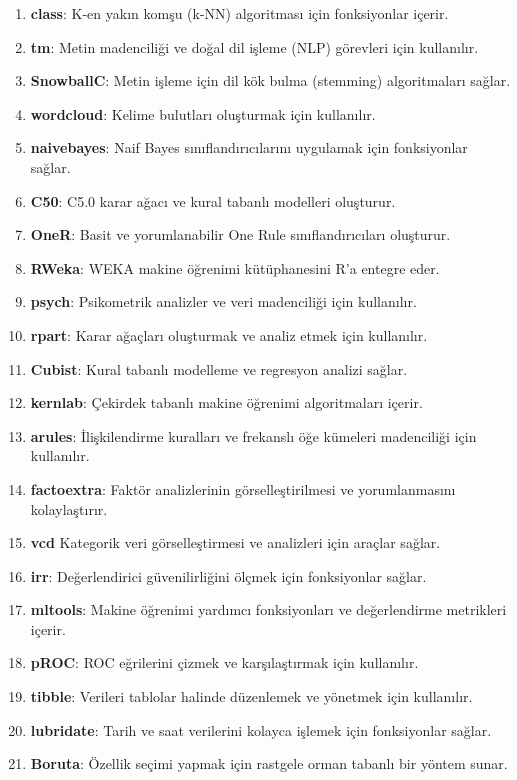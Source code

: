 \begin{enumerate}
    \item \textbf{class}: K-en yakın komşu (k-NN) algoritması için fonksiyonlar içerir.
    \item \textbf{tm}: Metin madenciliği ve doğal dil işleme (NLP) görevleri için kullanılır.
    \item \textbf{SnowballC}: Metin işleme için dil kök bulma (stemming) algoritmaları sağlar.
    \item \textbf{wordcloud}: Kelime bulutları oluşturmak için kullanılır.
    \item \textbf{naivebayes}: Naif Bayes sınıflandırıcılarını uygulamak için fonksiyonlar sağlar.
    \item \textbf{C50}: C5.0 karar ağacı ve kural tabanlı modelleri oluşturur.
    \item \textbf{OneR}: Basit ve yorumlanabilir One Rule sınıflandırıcıları oluşturur.
    \item \textbf{RWeka}: WEKA makine öğrenimi kütüphanesini R'a entegre eder.
    \item \textbf{psych}: Psikometrik analizler ve veri madenciliği için kullanılır.
    \item \textbf{rpart}: Karar ağaçları oluşturmak ve analiz etmek için kullanılır.
    \item \textbf{Cubist}: Kural tabanlı modelleme ve regresyon analizi sağlar.
    \item \textbf{kernlab}: Çekirdek tabanlı makine öğrenimi algoritmaları içerir.
    \item \textbf{arules}: İlişkilendirme kuralları ve frekanslı öğe kümeleri madenciliği için kullanılır.
    \item \textbf{factoextra}: Faktör analizlerinin görselleştirilmesi ve yorumlanmasını kolaylaştırır.
    \item \textbf{vcd} Kategorik veri görselleştirmesi ve analizleri için araçlar sağlar.
    \item \textbf{irr}: Değerlendirici güvenilirliğini ölçmek için fonksiyonlar sağlar.
    \item \textbf{mltools}: Makine öğrenimi yardımcı fonksiyonları ve değerlendirme metrikleri içerir.
    \item \textbf{pROC}: ROC eğrilerini çizmek ve karşılaştırmak için kullanılır.
    \item \textbf{tibble}: Verileri tablolar halinde düzenlemek ve yönetmek için kullanılır.
    \item \textbf{lubridate}: Tarih ve saat verilerini kolayca işlemek için fonksiyonlar sağlar.
    \item \textbf{Boruta}: Özellik seçimi yapmak için rastgele orman tabanlı bir yöntem sunar.

\end{enumerate}
